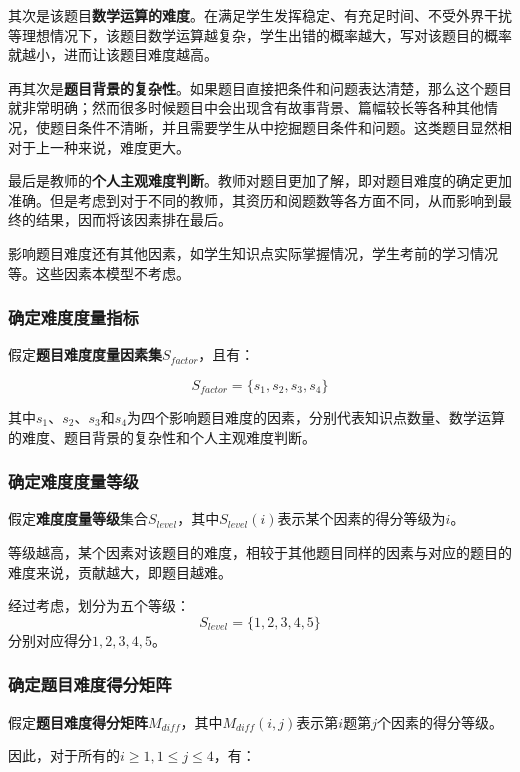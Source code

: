 其次是该题目\textbf{数学运算的难度}。在满足学生发挥稳定、有充足时间、不受外界干扰等理想情况下，该题目数学运算越复杂，学生出错的概率越大，写对该题目的概率就越小，进而让该题目难度越高。

再其次是\textbf{题目背景的复杂性}。如果题目直接把条件和问题表达清楚，那么这个题目就非常明确；然而很多时候题目中会出现含有故事背景、篇幅较长等各种其他情况，使题目条件不清晰，并且需要学生从中挖掘题目条件和问题。这类题目显然相对于上一种来说，难度更大。

最后是教师的\textbf{个人主观难度判断}。教师对题目更加了解，即对题目难度的确定更加准确。但是考虑到对于不同的教师，其资历和阅题数等各方面不同，从而影响到最终的结果，因而将该因素排在最后。

影响题目难度还有其他因素，如学生知识点实际掌握情况，学生考前的学习情况等。这些因素本模型不考虑。

\subsubsection{确定难度度量指标}

假定\textbf{题目难度度量因素集}$S_{factor}$，且有：

\begin{equation}
    S_{factor} = \{ s_1, s_2, s_3, s_4 \}
\end{equation}

其中$s_1$、$s_2$、$s_3$和$s_4$为四个影响题目难度的因素，分别代表知识点数量、数学运算的难度、题目背景的复杂性和个人主观难度判断。

\subsubsection{确定难度度量等级}

假定\textbf{难度度量等级}集合$S_{level}$，其中$S_{level}(i)$表示某个因素的得分等级为$i$。

等级越高，某个因素对该题目的难度，相较于其他题目同样的因素与对应的题目的难度来说，贡献越大，即题目越难。

经过考虑，划分为五个等级：
$$S_{level} = \{1, 2, 3, 4, 5\}$$
分别对应得分$1, 2, 3, 4, 5$。

\subsubsection{确定题目难度得分矩阵}

假定\textbf{题目难度得分矩阵}$M_{diff}$，其中$M_{diff}(i, j)$表示第$i$题第$j$个因素的得分等级。

因此，对于所有的$i \geq 1, 1 \leq j \leq 4$，有：

